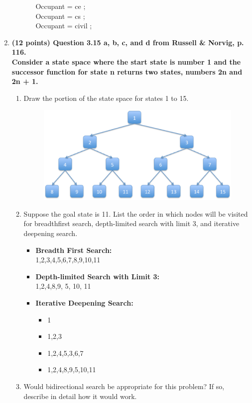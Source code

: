 \documentclass{article}%
\begin{document}
\begin{enumerate}
\begin{enumerate}
\begin{itemize}
		Occupant = ce ; \\

		Occupant = cs ; \\

		Occupant = civil ; 
		
		\end{itemize}

	\end{enumerate}



\item \textbf{(12 points) Question 3.15 a, b, c, and d from Russell \& Norvig, p. 116. \\
Consider a state space where the start state is number 1 and the successor function for
state n returns two states, numbers 2n and 2n + 1.}
	\begin{enumerate}
	\item Draw the portion of the state space for states 1 to 15.
	
	
\begin{figure}[h]
\centering
\includegraphics[scale=0.5, clip]{state1-15.eps} 
\vspace*{-2ex}
\end{figure}
	
	\item Suppose the goal state is 11. List the order in which nodes will be visited for breadthfirst
search, depth-limited search with limit 3, and iterative deepening search.

		\begin{itemize}
		\item \textbf{Breadth First Search:} \\
			1,2,3,4,5,6,7,8,9,10,11
		\item \textbf{Depth-limited Search with Limit 3:} \\
		    1,2,4,8,9, 5, 10, 11
		\item \textbf{Iterative Deepening Search:} \\
			\begin{itemize}
			\item 1
			\item 1,2,3
			\item 1,2,4,5,3,6,7
			\item 1,2,4,8,9,5,10,11
			\end{itemize}
		\end{itemize}
	\item Would bidirectional search be appropriate for this problem? If so, describe in detail
how it would work. \\


\end{enumerate}
\end{enumerate}
\end{document}
